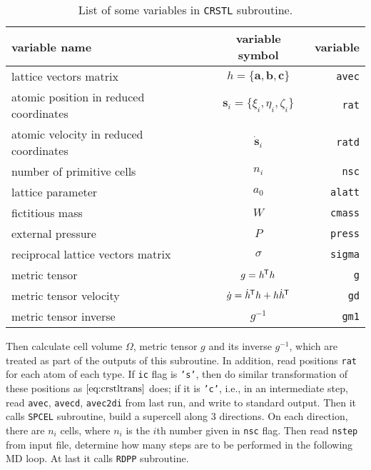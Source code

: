 \begin{table}[h]
	\centering
	\caption{List of some variables in \texttt{CRSTL} subroutine.}
	\begin{tabular}{@{}lcr@{}}
		\toprule
		variable name                          & variable symbol                                 & variable       \\
		\midrule
		lattice vectors matrix                 & $h = \{ \bm{a}, \bm{b}, \bm{c} \}$              & \texttt{avec}  \\
		atomic position in reduced coordinates & $\bm{s}_i = \{\xi_i, \eta_i, \zeta_i\}$         & \texttt{rat}   \\
		atomic velocity in reduced coordinates & $\dot{ \bm{s} }_i$                              & \texttt{ratd}  \\
		number of primitive cells              & $n_i$                                             & \texttt{nsc}   \\
		lattice parameter                      & $a_0$                                           & \texttt{alatt} \\
		fictitious mass                        & $W$                                             & \texttt{cmass} \\
		external pressure                      & $P$                                             & \texttt{press} \\
		reciprocal lattice vectors matrix      & $\sigma$                                        & \texttt{sigma} \\
		metric tensor                          & $g = h ^{\mkern-1.5mu\mathsf{T}} h$                                 & \texttt{g}     \\
		metric tensor velocity                 & $\dot{g} = \dot{ h }^{\mkern-1.5mu\mathsf{T}} h + h \dot{ h }^{\mkern-1.5mu\mathsf{T}}$ & \texttt{gd}    \\
		metric tensor inverse                  & $g^{-1}$                                        & \texttt{gm1}   \\
		\bottomrule
	\end{tabular}%
	\label{tab:crstl}%
\end{table}%

Then calculate cell volume $\Omega$, metric tensor $g$ and its inverse $g^{-1}$, which are
treated as part of the outputs of this subroutine.
In addition, read positions \texttt{rat} for each atom of each type.
If \texttt{ic} flag is \texttt{'s'},
then do similar transformation of these positions as $\eqref{eq:crstltrans}$ does;
if it is \texttt{'c'}, i.e., in an intermediate step, read
\texttt{avec}, \texttt{avecd}, \texttt{avec2di} from last run,
and write to standard output.
Then it calls \texttt{SPCEL} subroutine, build a supercell along $3$ directions. On each direction,
there are $n_i$ cells, where $n_i$ is the $i$th number given in \texttt{nsc} flag. 
Then read \texttt{nstep} from input file, determine how many steps are
to be performed in the following MD loop.
At last it calls \texttt{RDPP} subroutine.

